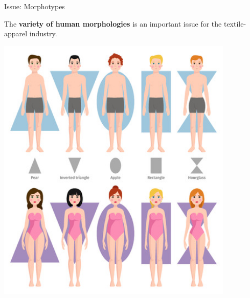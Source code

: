 \documentclass[10pt]{beamer}
\begin{document}
\begin{frame}{Issue: Morphotypes}
	\begin{block}{}
		\begin{minipage}[cl]{0.5\textwidth}
			\begin{flushleft}
				The \textbf{variety of human morphologies} is an important issue for the textile-apparel industry.


			\end{flushleft}
		\end{minipage}%
		\begin{minipage}[H]{0.5\textwidth}
			\centering
			\includegraphics[width=0.85\textwidth]{../Images/Morph1.jpg}
		\end{minipage}
	\end{block}
\end{frame}
\end{document}
